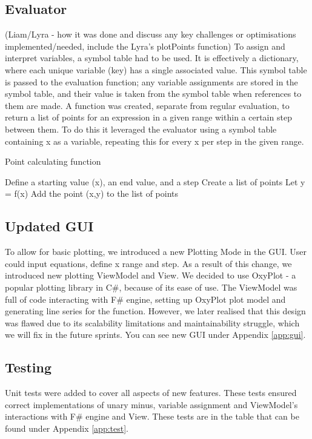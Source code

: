 \documentclass[a4paper, oneside, 11pt]{report}
\begin{document}
\subsection{Evaluator}
(Liam/Lyra - how it was done and discuss any key challenges or optimisations implemented/needed, include the Lyra's plotPoints function)
To assign and interpret variables, a symbol table had to be used. It is effectively a dictionary, where each unique variable (key) has a single associated value. This symbol table is passed to the evaluation function; any variable assignments are stored in the symbol table, and their value is taken from the symbol table when references to them are made.
A function was created, separate from regular evaluation, to return a list of points for an expression in a given range within a certain step between them. To do this it leveraged the evaluator using a symbol table containing x as a variable, repeating this for every x per step in the given range.

\begin{algorithm}[th]
\caption{ Point calculating function }
\begin{algorithmic}[1]
\STATE Define a starting value (x), an end value, and a step
\STATE Create a list of points
    \STATE Let y = f(x)
    \STATE Add the point (x,y) to the list of points
\ENDWHILE
\end{algorithmic}
\end{algorithm}

\subsection{Updated GUI}
To allow for basic plotting, we introduced a new Plotting Mode in the GUI. User could input equations, define x range and step. As a result of this change, we introduced new plotting ViewModel and View. We decided to use OxyPlot\cite{Oxyplot} - a popular plotting library in C\#, because of its ease of use. The ViewModel was full of code interacting with F\# engine, setting up OxyPlot plot model and generating line series for the function. However, we later realised that this design was flawed due to its scalability limitations and maintainability struggle, which we will fix in the future sprints. You can see new GUI under Appendix \ref{app:gui}.

\subsection{Testing}
Unit tests were added to cover all aspects of new features. These tests ensured correct implementations of unary minus, variable assignment and ViewModel’s interactions with F\# engine and View. These tests are in the table that can be found under Appendix \ref{app:test}.
\end{document}
